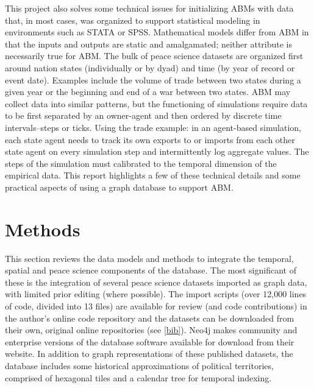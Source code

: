 \documentclass[runningheads]{llncs}
\begin{document}
This project also solves some technical issues for initializing ABMs with data that, in most cases, was organized to support statistical modeling in environments such as STATA\cite{stata} or SPSS\cite{spss}.
Mathematical models differ from ABM in that the inputs and outputs are static and amalgamated; neither attribute is necessarily true for ABM.
The bulk of peace science datasets are organized first around nation states (individually or by dyad) and time (by year of record or event date). 
Examples include the volume of trade between two states during a given year or the beginning and end of a war between two states.
ABM may collect data into similar patterns, but the functioning of simulations require data to be first separated by an owner-agent and then ordered by discrete time intervals--steps or ticks.
Using the trade example: in an agent-based simulation, each state agent needs to track its own exports to or imports from each other state agent on every simulation step and intermittently log aggregate values. 
The steps of the simulation must calibrated to the temporal dimension of the empirical data. 
This report highlights a few of these technical details and some practical aspects of using a graph database to support ABM.

\section{Methods\label{method}}
This section reviews the data models and methods to integrate the temporal, spatial and peace science components of the database.
The most significant of these is the integration of several peace science datasets imported as graph data, with limited prior editing (where possible).
The import scripts (over 12,000 lines of code, divided into 13 files) are available for review (and code contributions) in the author's online code repository \cite{dillon} and the datasets can be downloaded from their own, original online repositories (see \ref{bib}).
Neo4j\cite{neo4j} makes community and enterprise versions of the database software available for download from their website.
In addition to graph representations of these published datasets, the database includes some historical approximations of political territories, comprised of hexagonal tiles and a calendar tree for temporal indexing.
\end{document}
